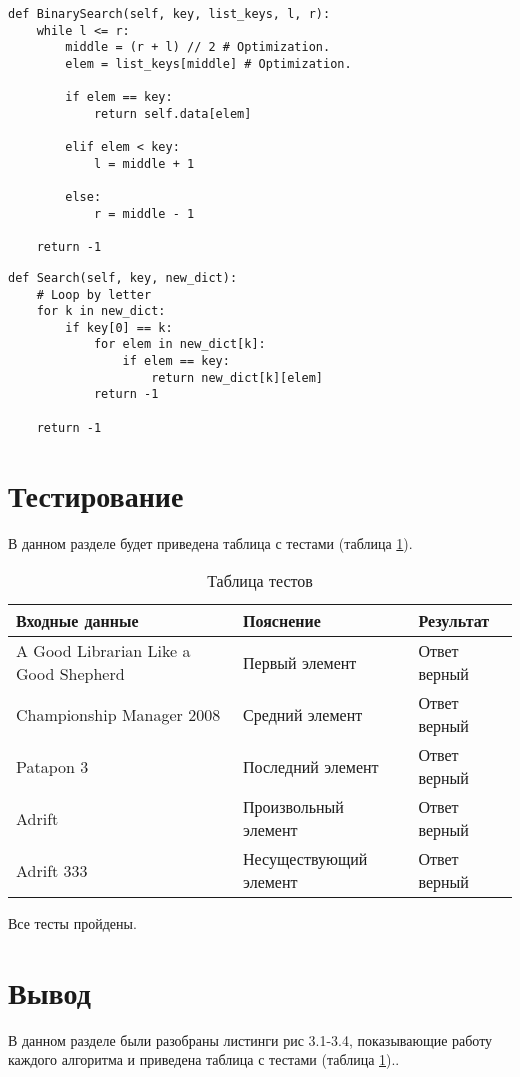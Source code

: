 \begin{lstlisting}[label=some-code,caption=Оптимизация бинарного поиска]
def BinarySearch(self, key, list_keys, l, r): 
	while l <= r:
		middle = (r + l) // 2 # Optimization.
		elem = list_keys[middle] # Optimization.

		if elem == key:
			return self.data[elem]

		elif elem < key:
			l = middle + 1

		else:
			r = middle - 1

	return -1
\end{lstlisting}

\begin{lstlisting}[label=some-code,caption=Частичный анализ]
def Search(self, key, new_dict):
	# Loop by letter
	for k in new_dict:
		if key[0] == k:
			for elem in new_dict[k]:
				if elem == key:
					return new_dict[k][elem]
			return -1
	
	return -1
\end{lstlisting}


\section{Тестирование}

В данном разделе будет приведена таблица с тестами (таблица \ref{table:ref1}).

\begin{table}[ht]
	\centering
	\caption{Таблица тестов}
	\label{table:ref1}
	\begin{tabular}{ | l | l | l |}
		\hline
		Входные данные                        & Пояснение              & Результат    \\ \hline
		A Good Librarian Like a Good Shepherd & Первый элемент         & Ответ верный \\ \hline
		Championship Manager 2008             & Средний элемент        & Ответ верный \\ \hline
		Patapon 3                             & Последний элемент      & Ответ верный \\ \hline
		Adrift                                & Произвольный элемент   & Ответ верный \\ \hline
		Adrift 333                            & Несуществующий элемент & Ответ верный \\ \hline
		\hline
	\end{tabular}
\end{table}

Все тесты пройдены.

\section{Вывод}

В данном разделе были разобраны листинги рис 3.1-3.4, показывающие работу каждого алгоритма и
приведена таблица с тестами (таблица \ref{table:ref1})..